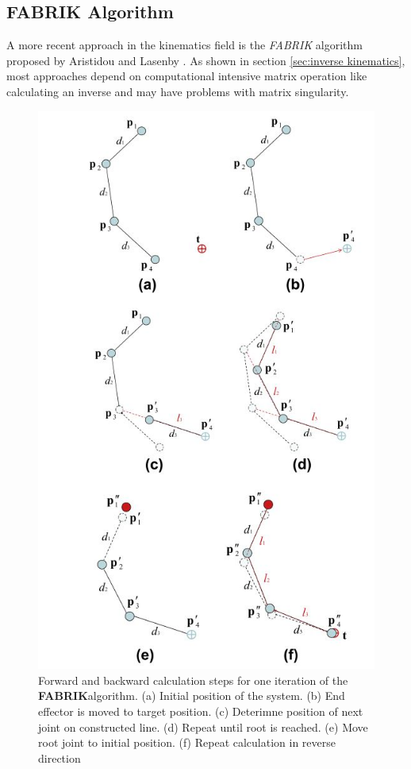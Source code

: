 \subsection{FABRIK Algorithm}
\label{sec:fabrik_algorithm}
A more recent approach in the kinematics field is the \textit{FABRIK} algorithm proposed by Aristidou and Lasenby \cite{Aristidou.2011}. As shown in section \ref{sec:inverse kinematics}, most approaches depend on computational intensive matrix operation like calculating an inverse and may have problems with matrix singularity.\\
\begin{figure}
\includegraphics[width=\textwidth/2]{images/FabrikIteration.jpg}
\caption{Forward and backward calculation steps for one iteration of the \textbf{FABRIK}algorithm. (a) Initial position of the system. (b) End effector is moved to target position. (c) Deterimne position of next joint on constructed line. (d) Repeat until root is reached. (e) Move root joint to initial position. (f) Repeat calculation in reverse direction \cite{Aristidou.2011} }
\label{fig:Fabrik_Iteration}
\end{figure}

